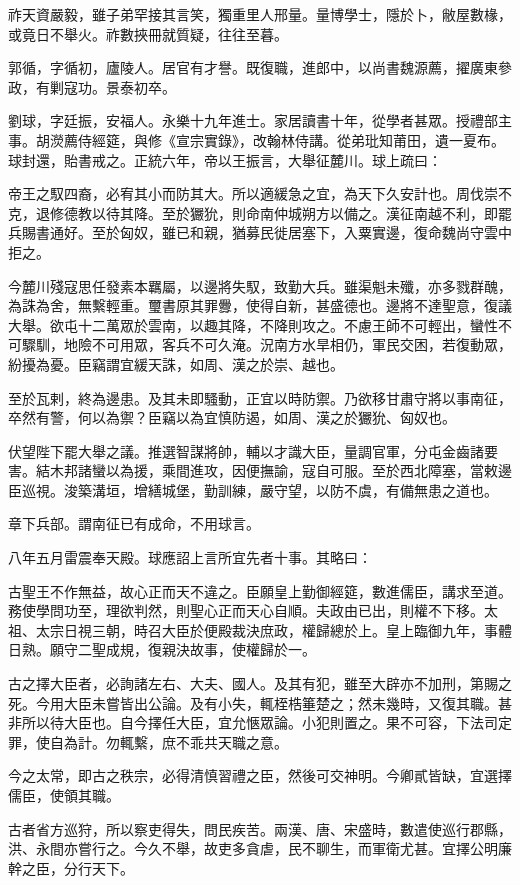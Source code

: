\begin{pinyinscope}
祚天資嚴毅，雖子弟罕接其言笑，獨重里人邢量。量博學士，隱於卜，敝屋數椽，或竟日不舉火。祚數挾冊就質疑，往往至暮。

郭循，字循初，廬陵人。居官有才譽。既復職，進郎中，以尚書魏源薦，擢廣東參政，有剿寇功。景泰初卒。

劉球，字廷振，安福人。永樂十九年進士。家居讀書十年，從學者甚眾。授禮部主事。胡濙薦侍經筵，與修《宣宗實錄》，改翰林侍講。從弟玭知莆田，遺一夏布。球封還，貽書戒之。正統六年，帝以王振言，大舉征麓川。球上疏曰：

帝王之馭四裔，必宥其小而防其大。所以適緩急之宜，為天下久安計也。周伐崇不克，退修德教以待其降。至於玁狁，則命南仲城朔方以備之。漢征南越不利，即罷兵賜書通好。至於匈奴，雖已和親，猶募民徙居塞下，入粟實邊，復命魏尚守雲中拒之。

今麓川殘寇思任發素本羈屬，以邊將失馭，致勤大兵。雖渠魁未殲，亦多戮群醜，為誅為舍，無繫輕重。璽書原其罪釁，使得自新，甚盛德也。邊將不達聖意，復議大舉。欲屯十二萬眾於雲南，以趣其降，不降則攻之。不慮王師不可輕出，蠻性不可驟馴，地險不可用眾，客兵不可久淹。況南方水旱相仍，軍民交困，若復動眾，紛擾為憂。臣竊謂宜緩天誅，如周、漢之於崇、越也。

至於瓦剌，終為邊患。及其未即騷動，正宜以時防禦。乃欲移甘肅守將以事南征，卒然有警，何以為禦？臣竊以為宜慎防遏，如周、漢之於玁狁、匈奴也。

伏望陛下罷大舉之議。推選智謀將帥，輔以才識大臣，量調官軍，分屯金齒諸要害。結木邦諸蠻以為援，乘間進攻，因便撫諭，寇自可服。至於西北障塞，當敕邊臣巡視。浚築溝垣，增繕城堡，勤訓練，嚴守望，以防不虞，有備無患之道也。

章下兵部。謂南征已有成命，不用球言。

八年五月雷震奉天殿。球應詔上言所宜先者十事。其略曰：

古聖王不作無益，故心正而天不違之。臣願皇上勤御經筵，數進儒臣，講求至道。務使學問功至，理欲判然，則聖心正而天心自順。夫政由已出，則權不下移。太祖、太宗日視三朝，時召大臣於便殿裁決庶政，權歸總於上。皇上臨御九年，事體日熟。願守二聖成規，復親決故事，使權歸於一。

古之擇大臣者，必詢諸左右、大夫、國人。及其有犯，雖至大辟亦不加刑，第賜之死。今用大臣未嘗皆出公論。及有小失，輒桎梏箠楚之；然未幾時，又復其職。甚非所以待大臣也。自今擇任大臣，宜允愜眾論。小犯則置之。果不可容，下法司定罪，使自為計。勿輒繫，庶不乖共天職之意。

今之太常，即古之秩宗，必得清慎習禮之臣，然後可交神明。今卿貳皆缺，宜選擇儒臣，使領其職。

古者省方巡狩，所以察吏得失，問民疾苦。兩漢、唐、宋盛時，數遣使巡行郡縣，洪、永間亦嘗行之。今久不舉，故吏多貪虐，民不聊生，而軍衛尤甚。宜擇公明廉幹之臣，分行天下。


\end{pinyinscope}
